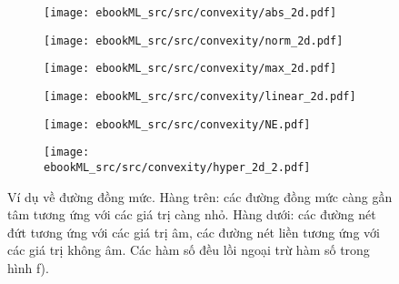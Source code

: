 \begin{figure}[t]
    \begin{subfigure}{0.325\textwidth}
        \texttt{[image: ebookML\_src/src/convexity/abs\_2d.pdf]}
        \caption{}
    \end{subfigure}
    \begin{subfigure}{0.325\textwidth}
        \texttt{[image: ebookML\_src/src/convexity/norm\_2d.pdf]}
        \caption{}
    \end{subfigure}
    \begin{subfigure}{0.325\textwidth}
        \texttt{[image: ebookML\_src/src/convexity/max\_2d.pdf]}
        \caption{}
    \end{subfigure}

    \begin{subfigure}{0.325\textwidth}
        \texttt{[image: ebookML\_src/src/convexity/linear\_2d.pdf]}
        \caption{}
        \label{fig:16_contoursd}
    \end{subfigure}
    \begin{subfigure}{0.325\textwidth}
        \texttt{[image: ebookML\_src/src/convexity/NE.pdf]}
        \caption{}
        \label{fig:16_contourse}
    \end{subfigure}
    \begin{subfigure}{0.325\textwidth}
        \texttt{[image: ebookML\_src/src/convexity/hyper\_2d\_2.pdf]}
        \caption{}
        \label{fig:16_contoursf}
    \end{subfigure}
    \caption{Ví dụ về đường đồng mức. Hàng trên: các đường đồng mức càng gần tâm tương ứng với các giá trị càng nhỏ. Hàng dưới: các đường nét đứt tương ứng với các giá trị âm, các đường nét liền tương ứng với các giá trị không âm. Các hàm số đều lồi ngoại trừ hàm số trong hình f).}
    \label{fig:16_contours}
\end{figure}
 
